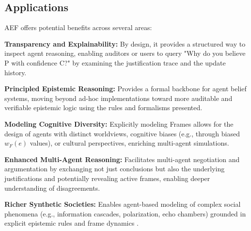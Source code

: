 \documentclass[10pt,a4paper]{article}
\begin{document}
\subsection{Applications}
AEF offers potential benefits across several areas:

\textbf{Transparency and Explainability:} By design, it provides a structured way to inspect agent reasoning, enabling auditors or users to query "Why do you believe P with confidence C?" by examining the justification trace and the update history.

\textbf{Principled Epistemic Reasoning:} Provides a formal backbone for agent belief systems, moving beyond ad-hoc implementations toward more auditable and verifiable epistemic logic using the rules and formalisms presented.

\textbf{Modeling Cognitive Diversity:} Explicitly modeling Frames allows for the design of agents with distinct worldviews, cognitive biases (e.g., through biased $w_F(e)$ values), or cultural perspectives, enriching multi-agent simulations.

\textbf{Enhanced Multi-Agent Reasoning:} Facilitates multi-agent negotiation and argumentation by exchanging not just conclusions but also the underlying justifications and potentially revealing active frames, enabling deeper understanding of disagreements.

\textbf{Richer Synthetic Societies:} Enables agent-based modeling of complex social phenomena (e.g., information cascades, polarization, echo chambers) grounded in explicit epistemic rules and frame dynamics \citep{epstein1996growing, abm_dynamic1}.
\end{document}
